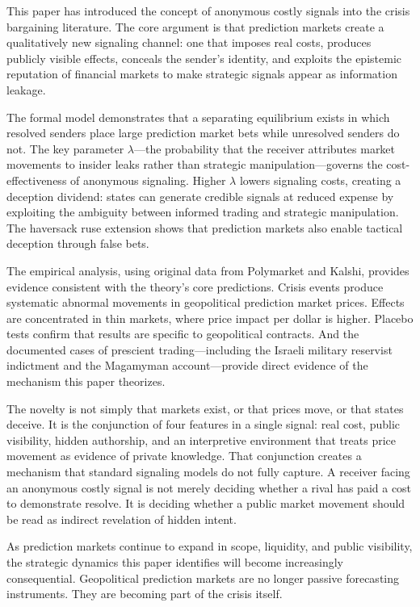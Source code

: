 \documentclass[12pt]{article}
\begin{document}
This paper has introduced the concept of anonymous costly signals into the crisis bargaining literature. The core argument is that prediction markets create a qualitatively new signaling channel: one that imposes real costs, produces publicly visible effects, conceals the sender's identity, and exploits the epistemic reputation of financial markets to make strategic signals appear as information leakage.

The formal model demonstrates that a separating equilibrium exists in which resolved senders place large prediction market bets while unresolved senders do not. The key parameter $\lambda$---the probability that the receiver attributes market movements to insider leaks rather than strategic manipulation---governs the cost-effectiveness of anonymous signaling. Higher $\lambda$ lowers signaling costs, creating a deception dividend: states can generate credible signals at reduced expense by exploiting the ambiguity between informed trading and strategic manipulation. The haversack ruse extension shows that prediction markets also enable tactical deception through false bets.

The empirical analysis, using original data from Polymarket and Kalshi, provides evidence consistent with the theory's core predictions. Crisis events produce systematic abnormal movements in geopolitical prediction market prices. Effects are concentrated in thin markets, where price impact per dollar is higher. Placebo tests confirm that results are specific to geopolitical contracts. And the documented cases of prescient trading---including the Israeli military reservist indictment and the Magamyman account---provide direct evidence of the mechanism this paper theorizes.

The novelty is not simply that markets exist, or that prices move, or that states deceive. It is the conjunction of four features in a single signal: real cost, public visibility, hidden authorship, and an interpretive environment that treats price movement as evidence of private knowledge. That conjunction creates a mechanism that standard signaling models do not fully capture. A receiver facing an anonymous costly signal is not merely deciding whether a rival has paid a cost to demonstrate resolve. It is deciding whether a public market movement should be read as indirect revelation of hidden intent.

As prediction markets continue to expand in scope, liquidity, and public visibility, the strategic dynamics this paper identifies will become increasingly consequential. Geopolitical prediction markets are no longer passive forecasting instruments. They are becoming part of the crisis itself.
\end{document}
